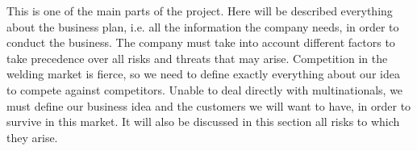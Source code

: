 This is one of the main parts of the project. Here will be described everything about the business plan, i.e. all the information the company needs, in order to conduct the business. The company must take into account different factors to take precedence over all risks and threats that may arise. Competition in the welding market is fierce, so we need to define exactly everything about our idea to compete against competitors. Unable to deal directly with multinationals, we must define our business idea and the customers we will want to have, in order to survive in this market. It will also be discussed in this section all risks to which they arise.


